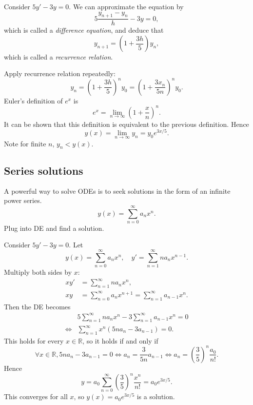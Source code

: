 \documentclass[10pt]{article}
\newcommand{\bluecomment}[1]{{\color{blue}#1}}
\begin{document}
    \begin{example}
        Consider $ 5y'-3y=0 $. We can approximate the equation by 
        \[
            5\frac{y_{n+1}-y_n}{h}-3y=0
        ,\]
        which is called a \textit{difference equation}, and deduce that 
        \[
            y_{n+1}=\left( 1+\frac{3h}{5} \right)y_n
        ,\]
        which is called a \textit{recurrence relation}.

        Apply recurrence relation repeatedly:
        \[
            y_n=\left( 1+\frac{3h}{5} \right)^{n}y_{0}=\left( 1+\frac{3x_n}{5n} \right)^{n}y_{0}
        .\]
        Euler's definition of $ e^x $ is 
        \[
            e^x=\lim_{n \to \infty} \left( 1+\frac{x}{n} \right)^n
        .\]
        It can be shown that this definition is equivalent to the previous definition. Hence 
        \[
            y(x)=\lim_{n \to \infty} y_n = y_0e^{3x/5}
        .\]
        \bluecomment{Note for finite $n$, $y_n<y(x)$.}
    \end{example}
    \subsection{Series solutions}
    A powerful way to solve ODEs is to seek solutions in the form of an infinite power series. 
    \[
        y(x)=\sum_{n=0}^{\infty}a_n x^n
    .\]
    Plug into DE and find a solution.
    \begin{example}
        Consider $ 5y'-3y=0 $. Let 
        \[
            y(x)=\sum_{n=0}^{\infty}a_n x^n, \quad y'=\sum_{n=1}^{\infty}na_n x^{n-1}
        .\]
        Multiply both sides by $x$:
        \[
            \begin{aligned}
                xy'&=\sum_{n=1}^{\infty}na_nx^n,\\
                xy&= \sum_{n=0}^{\infty}a_n x^{n+1}=\sum_{n=1}^{\infty}a_{n-1} x^{n}.
            \end{aligned}
        \]
        Then the DE becomes 
        \[
            \begin{aligned}
                &5\sum_{n=1}^{\infty}na_nx^n-3\sum_{n=1}^{\infty}a_{n-1} x^{n}=0\\
                \Longleftrightarrow & \sum_{n=1}^{\infty}x^n\left( 5na_n-3a_{n-1} \right)=0.
            \end{aligned}
        \]
        This holds for every $x\in \mathbb{R}$, so it holds if and only if
        \[
            \forall x\in \mathbb{R}, 5na_n-3a_{n-1}=0 \Longleftrightarrow a_n = \frac{3}{5n}a_{n-1} \Longleftrightarrow a_n=\left( \frac{3}{5} \right)^n \frac{a_0}{n!}
        .\]
        Hence
        \[
            y= a_0\sum_{n=0}^{\infty} \left( \frac{3}{5} \right)^n \frac{x^n}{n!} = a_0 e^{3x/5}
        .\]
        This converges for all $x$, so $ y(x)=a_0 e^{3x/5} $ is a solution.
    \end{example}
\end{document}

